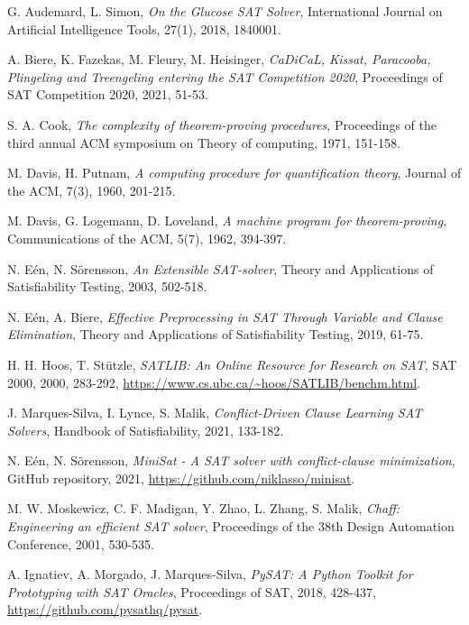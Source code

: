 \documentclass[a4paper,10pt]{article}
\begin{document}

\begin{thebibliography}{10}

G. Audemard, L. Simon,
\textit{On the Glucose SAT Solver},
International Journal on Artificial Intelligence Tools, 27(1), 2018, 1840001.

A. Biere, K. Fazekas, M. Fleury, M. Heisinger,
\textit{CaDiCaL, Kissat, Paracooba, Plingeling and Treengeling entering the SAT Competition 2020},
Proceedings of SAT Competition 2020, 2021, 51-53.

S. A. Cook,
\textit{The complexity of theorem-proving procedures},
Proceedings of the third annual ACM symposium on Theory of computing, 1971, 151-158.

M. Davis, H. Putnam,
\textit{A computing procedure for quantification theory},
Journal of the ACM, 7(3), 1960, 201-215.

M. Davis, G. Logemann, D. Loveland,
\textit{A machine program for theorem-proving},
Communications of the ACM, 5(7), 1962, 394-397.

N. Eén, N. Sörensson,
\textit{An Extensible SAT-solver},
Theory and Applications of Satisfiability Testing, 2003, 502-518.

N. Eén, A. Biere, 
\textit{Effective Preprocessing in SAT Through Variable and Clause Elimination},
Theory and Applications of Satisfiability Testing, 2019, 61-75.

H. H. Hoos, T. Stützle,
\textit{SATLIB: An Online Resource for Research on SAT},
SAT 2000, 2000, 283-292,
\url{https://www.cs.ubc.ca/~hoos/SATLIB/benchm.html}.

J. Marques-Silva, I. Lynce, S. Malik,
\textit{Conflict-Driven Clause Learning SAT Solvers},
Handbook of Satisfiability, 2021, 133-182.

N. Eén, N. Sörensson,
\textit{MiniSat - A SAT solver with conflict-clause minimization},
GitHub repository, 2021,
\url{https://github.com/niklasso/minisat}.

M. W. Moskewicz, C. F. Madigan, Y. Zhao, L. Zhang, S. Malik,
\textit{Chaff: Engineering an efficient SAT solver},
Proceedings of the 38th Design Automation Conference, 2001, 530-535.

A. Ignatiev, A. Morgado, J. Marques-Silva,
\textit{PySAT: A Python Toolkit for Prototyping with SAT Oracles},
Proceedings of SAT, 2018, 428-437,
\url{https://github.com/pysathq/pysat}.


\end{thebibliography}
\end{document}
